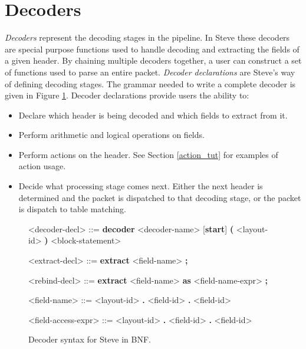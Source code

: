 \section{Decoders} \label{decoder_tut}

\textit{Decoders} represent the decoding stages in the pipeline. In Steve these decoders are special purpose functions used to handle decoding and extracting the fields of a given header. By chaining multiple decoders together, a user can construct a set of functions used to parse an entire packet. \textit{Decoder declarations} are Steve's way of defining decoding stages. The grammar needed to write a complete decoder is given in Figure \ref{fg:decoder_syntax}. Decoder declarations provide users the ability to:

\begin{itemize}
\item Declare which header is being decoded and which fields to extract from it.
\item Perform arithmetic and logical operations on fields.
\item Perform actions on the header. See Section \ref{action_tut} for examples of action usage.
\item Decide what processing stage comes next. Either the next header is determined and the packet is dispatched to that decoding stage, or the packet is dispatch to table matching.
\end{itemize}

\begin{figure}[ht]
\begin{mdframed}
\begin{grammar}

<decoder-decl> ::=
\textbf{decoder} <decoder-name> [\textbf{start}] 
\textbf{(} <layout-id> \textbf{)}
<block-statement>

<extract-decl> ::=
\textbf{extract} <field-name> \textbf{;}

<rebind-decl> ::=
\textbf{extract} <field-name> \textbf{as} <field-name-expr> \textbf{;}

<field-name> ::=
<layout-id> \textbf{.} <field-id>
 \textbf{.} <field-id>

<field-access-expr> ::=
<layout-id> \textbf{.} <field-id>
 \textbf{.} <field-id>

\end{grammar}
\end{mdframed}
\caption{Decoder syntax for Steve in BNF.}
\label{fg:decoder_syntax}
\end{figure}

